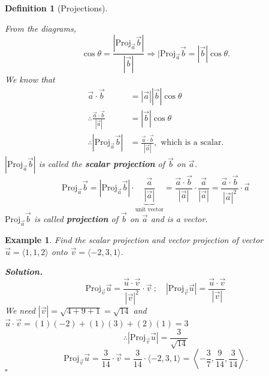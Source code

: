\documentclass[12pt,a4paper]{article}
\newtheorem{df}{Definition}[subsection]
\newtheorem{eg}{Example}[subsection]
\newenvironment*{sol}{\par\indent\textbf{Solution. }}{\hfill{$\square$}\par}
\def\Proj{\mathrm{Proj}}
\def\vecv{\vec{v}}
\def\vecu{\vec{u}}
\def\veca{\vec{a}}
\def\vecb{\vec{b}}
\begin{document}
\begin{df}[Projections]
\begin{center}
	\end{center}
	From the diagrams, \[\cos\theta=\frac{|\Proj_{\veca}\vecb|}{|\vecb|}\Longrightarrow|\Proj_{\veca}\vecb=\boxed{|\vecb|\cos\theta}.\]
	We know that \[\begin{aligned}
		\veca\cdot\vecb&=|\veca||\vecb|\cos\theta\\
		\therefore\frac{\veca\cdot\vecb}{|\veca|}&=\boxed{|\vecb|\cos\theta}\\
		\therefore |\Proj_{\veca}\vecb|&=\frac{\veca\cdot\vecb}{|\veca|},\text{ which is a scalar.}
	\end{aligned}\]
	$|\Proj_{\veca}\vecb|$ is called the \textbf{scalar projection} of $\vecb$ on $\veca$.
	\[\Proj_{\veca}\vecb=|\Proj_{\veca}\vecb|\cdot\underbrace{\frac{\veca}{|\veca|}}_{\text{unit vector}}=\frac{\veca\cdot\vecb}{|\veca|}\cdot\frac{\veca}{|\veca|}=\frac{\veca\cdot\vecb}{|\veca|^2}\cdot\veca\]
	$\Proj_{\veca}\vecb$ is called \textbf{projection} of $\vecb$ on $\veca$ and is a vector. 
\end{df}
\begin{eg}
	Find the scalar projection and vector projection of vector $\vecu=\langle1,1,2\rangle$ onto $\vecv=\langle-2,3,1\rangle$.
	\begin{sol}
		\[\Proj_{\vecv}\vecu=\frac{\vecu\cdot\vecv}{|\vecv|^2}\cdot\vecv\ ;\quad |\Proj_{\vecv}\vecu|=\frac{\vecu\cdot\vecv}{|\vecv|}\]
		We need $|\vecv|=\sqrt{4+9+1}=\sqrt{14}$ and $\vecu\cdot\vecv=(1)(-2)+(1)(3)+(2)(1)=3$
		\[\therefore |\Proj_{\vecv}\vecu|=\frac{3}{\sqrt{14}}\]
		\[\Proj_{\vecv}\vecu=\frac{3}{14}\cdot\vecv=\frac{3}{14}\cdot\langle-2,3,1\rangle=\left\langle-\frac{3}{7},\frac{9}{14},\frac{3}{14}\right\rangle.\]
	\end{sol}
\end{eg}
\end{document}
